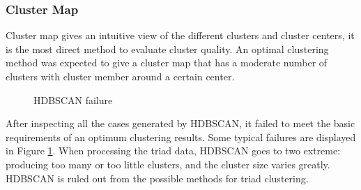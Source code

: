 \documentclass[a4paper]{article}
\begin{document}
\subsubsection{Cluster Map}
Cluster map gives an intuitive view of the different clusters and cluster centers, it is the most direct method to evaluate cluster quality. An optimal clustering method was expected to give a cluster map that has a moderate number of clusters with cluster member around a certain center. 
\begin{figure}[H]
    \centering
    \caption{HDBSCAN failure}
    \label{fig: HDBSCAN failure}
\end{figure}
After inspecting all the cases generated by HDBSCAN, it failed to meet the basic requirements of an optimum clustering results. Some typical failures are displayed in Figure \ref{fig: HDBSCAN failure}. When processing the triad data, HDBSCAN goes to two extreme: producing too many or too little clusters, and the cluster size varies greatly. HDBSCAN is ruled out from the possible methods for triad clustering.
\end{document}
